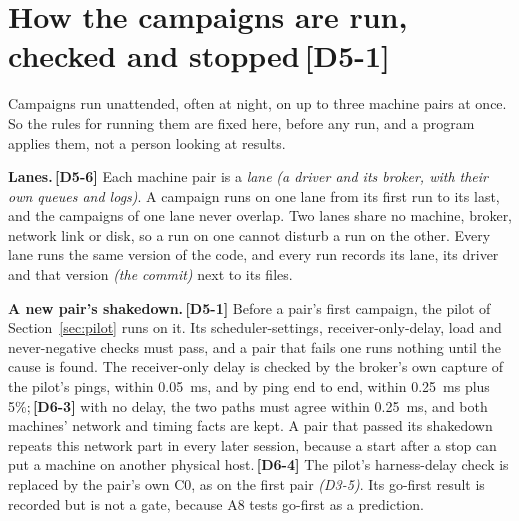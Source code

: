 \documentclass[11pt]{article}
\newcommand{\gl}[1]{{\color{soft}\itshape\small (#1)}}
\newcommand{\chg}[1]{\,{\color{chgcol}\bfseries\footnotesize[#1]}}
\newcommand{\chgold}[1]{\,{\color{oldcol}\bfseries\footnotesize[#1]}}
\begin{document}
\section[How the campaigns are run, checked and stopped]{How the campaigns are run, checked and stopped\protect\chgold{D5-1}}\label{sec:operations}
Campaigns run unattended, often at night, on up to three machine pairs at once. So the rules for running them are fixed here, before any run, and a program applies them, not a person looking at results.

\textbf{Lanes.}\chgold{D5-6} Each machine pair is a \emph{lane} \gl{a driver and its broker, with their own queues and logs}. A campaign runs on one lane from its first run to its last, and the campaigns of one lane never overlap. Two lanes share no machine, broker, network link or disk, so a run on one cannot disturb a run on the other. Every lane runs the same version of the code, and every run records its lane, its driver and that version \gl{the commit} next to its files.

\textbf{A new pair's shakedown.}\chgold{D5-1} Before a pair's first campaign, the pilot of Section~\ref{sec:pilot} runs on it. Its scheduler-settings, receiver-only-delay, load and never-negative checks must pass, and a pair that fails one runs nothing until the cause is found. The receiver-only delay is checked by the broker's own capture of the pilot's pings, within 0.05~ms, and by ping end to end, within 0.25~ms plus 5\%;\chg{D6-3} with no delay, the two paths must agree within 0.25~ms, and both machines' network and timing facts are kept. A pair that passed its shakedown repeats this network part in every later session, because a start after a stop can put a machine on another physical host.\chg{D6-4} The pilot's harness-delay check is replaced by the pair's own C0, as on the first pair \gl{D3-5}. Its go-first result is recorded but is not a gate, because A8 tests go-first as a prediction.
\end{document}

